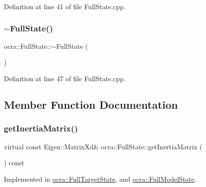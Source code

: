 Definition at line 41 of file Full\+State.\+cpp.

\hypertarget{classocra_1_1FullState_a7392bab88e107fe2862c01eb9c9bc1a4}{}\label{classocra_1_1FullState_a7392bab88e107fe2862c01eb9c9bc1a4} 
\subsubsection{\texorpdfstring{$\sim$\+Full\+State()}{~FullState()}}
{\footnotesize\ttfamily ocra\+::\+Full\+State\+::$\sim$\+Full\+State (\begin{DoxyParamCaption}{ }\end{DoxyParamCaption})\hspace{0.3cm}{\ttfamily [pure virtual]}}



Definition at line 47 of file Full\+State.\+cpp.



\subsection{Member Function Documentation}
\hypertarget{classocra_1_1FullState_a5d5c2ddfaf4868f78b4621d27b500784}{}\label{classocra_1_1FullState_a5d5c2ddfaf4868f78b4621d27b500784} 
\subsubsection{\texorpdfstring{get\+Inertia\+Matrix()}{getInertiaMatrix()}}
{\footnotesize\ttfamily virtual const Eigen\+::\+Matrix\+Xd\& ocra\+::\+Full\+State\+::get\+Inertia\+Matrix (\begin{DoxyParamCaption}{ }\end{DoxyParamCaption}) const\hspace{0.3cm}{\ttfamily [pure virtual]}}



Implemented in \hyperlink{classocra_1_1FullTargetState_ad7a1b06462ba3cc348e5634e1a0db0b2}{ocra\+::\+Full\+Target\+State}, and \hyperlink{classocra_1_1FullModelState_a988dec9567fd2b083ecfb6f3348d9a09}{ocra\+::\+Full\+Model\+State}.

\hypertarget{classocra_1_1FullState_a10f3a888554035bf13b3f636ce4b4edc}{}\label{classocra_1_1FullState_a10f3a888554035bf13b3f636ce4b4edc} 
